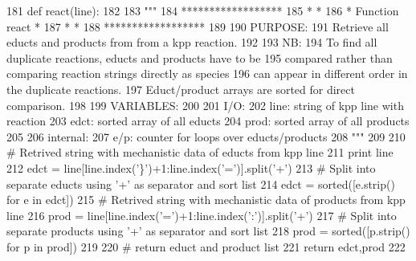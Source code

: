 \begin{DoxyCode}
181 \textcolor{keyword}{def }react(line):
182 
183     \textcolor{stringliteral}{"""}
184 \textcolor{stringliteral}{    ******************}
185 \textcolor{stringliteral}{    *                *}
186 \textcolor{stringliteral}{    * Function react *}
187 \textcolor{stringliteral}{    *                *}
188 \textcolor{stringliteral}{    ******************}
189 \textcolor{stringliteral}{}
190 \textcolor{stringliteral}{    PURPOSE:}
191 \textcolor{stringliteral}{        Retrieve all educts and products from from a kpp reaction.}
192 \textcolor{stringliteral}{}
193 \textcolor{stringliteral}{    NB:}
194 \textcolor{stringliteral}{        To find all duplicate reactions, educts and products have to be}
195 \textcolor{stringliteral}{        compared rather than comparing reaction strings directly as species}
196 \textcolor{stringliteral}{        can appear in different order in the duplicate reactions.}
197 \textcolor{stringliteral}{        Educt/product arrays are sorted for direct comparison.}
198 \textcolor{stringliteral}{}
199 \textcolor{stringliteral}{    VARIABLES:}
200 \textcolor{stringliteral}{}
201 \textcolor{stringliteral}{    I/O:}
202 \textcolor{stringliteral}{        line:   string of kpp line with reaction}
203 \textcolor{stringliteral}{        edct:   sorted array of all educts}
204 \textcolor{stringliteral}{        prod:   sorted array of all products}
205 \textcolor{stringliteral}{}
206 \textcolor{stringliteral}{    internal:}
207 \textcolor{stringliteral}{        e/p:    counter for loops over educts/products}
208 \textcolor{stringliteral}{    """}
209 
210 \textcolor{comment}{# Retrived string with mechanistic data of educts from kpp line}
211     \textcolor{keywordflow}{print} line
212     edct = line[line.index(\textcolor{stringliteral}{'\}'})+1:line.index(\textcolor{stringliteral}{'='})].split(\textcolor{stringliteral}{'+'})
213 \textcolor{comment}{# Split into separate educts using '+' as separator and sort list}
214     edct = sorted([e.strip() \textcolor{keywordflow}{for} e \textcolor{keywordflow}{in} edct])
215 \textcolor{comment}{# Retrived string with mechanistic data of products from kpp line}
216     prod = line[line.index(\textcolor{stringliteral}{'='})+1:line.index(\textcolor{stringliteral}{':'})].split(\textcolor{stringliteral}{'+'})
217 \textcolor{comment}{# Split into separate products using '+' as separator and sort list}
218     prod = sorted([p.strip() \textcolor{keywordflow}{for} p \textcolor{keywordflow}{in} prod])
219 
220 \textcolor{comment}{# return educt and product list}
221     \textcolor{keywordflow}{return} edct,prod
222 
\end{DoxyCode}
\mbox{\label{namespacesrchRXN_a954f72527cf0bb8f711f715c6919a936}} 
